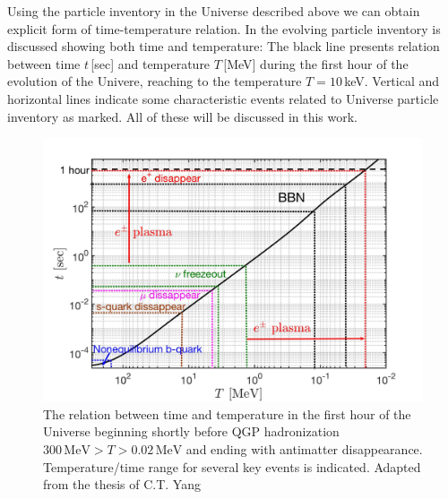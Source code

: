 {Using the particle inventory in the Universe described above we can obtain explicit form of time-temperature relation. In  the evolving particle inventory is discussed  showing both time and temperature: The black line presents relation between time $t$\,[sec] and temperature $T$\,[MeV] during the first hour of the evolution of the Univere, reaching to the temperature $T=10$\,keV. Vertical and horizontal lines indicate some characteristic events related to Universe particle inventory as marked. All of these will be discussed in this work. 
\begin{figure}
\centerline{\includegraphics[width=\textwidth,width=\linewidth]{01-introduction/Figures/CosmicTimeTemperature.jpg}}
 \caption{The relation between time and temperature in the first hour of the Universe beginning shortly before QGP hadronization $300\,\mathrm{MeV}>T>0.02\,\mathrm{MeV} $ and ending with antimatter disappearance. Temperature/time range for several key events is indicated. Adapted from the thesis of C.T. Yang \cite{Yang:2024ret}}
 \label{Fig:Overview}
\end{figure}

}
